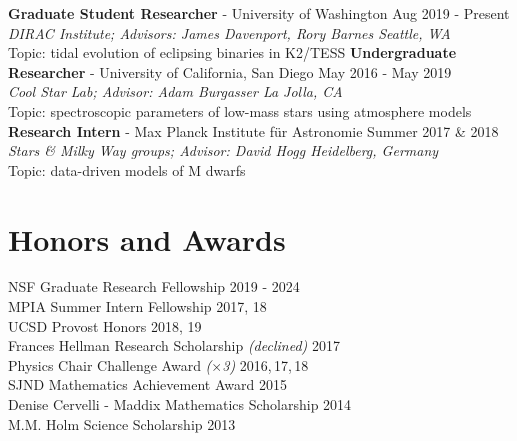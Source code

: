 \documentclass[margin,line]{resume}
\begin{document}
\begin{resume}
\textbf{Graduate Student Researcher} - University of Washington \hfill Aug 2019 - Present \\
\-\hspace{.25cm} \textit{DIRAC Institute; Advisors: James Davenport, Rory Barnes \hfill Seattle, WA} \\
\-\hspace{.25cm} Topic: tidal evolution of eclipsing binaries in K2/TESS
\vspace{.2cm} \newline
\textbf{Undergraduate Researcher} - University of California, San Diego \hfill May 2016 - May 2019  \\
\-\hspace{.25cm} \textit{Cool Star Lab; Advisor: Adam Burgasser \hfill La Jolla, CA} \\ 
\-\hspace{.25cm} Topic: spectroscopic parameters of low-mass stars using atmosphere models 
\vspace{.2cm} \newline
\textbf{Research Intern} - Max Planck Institute f{\"u}r Astronomie \hfill Summer 2017 \& 2018 \\
\-\hspace{.25cm} \textit{Stars \& Milky Way groups; Advisor: David Hogg \hfill Heidelberg, Germany} \\
\-\hspace{.25cm} Topic: data-driven models of M dwarfs



\section{\mysidestyle \textcolor{bcolor}{Honors and Awards}}
NSF Graduate Research Fellowship \hfill 2019 - 2024 \\
MPIA Summer Intern Fellowship \hfill 2017, 18 \\
UCSD Provost Honors \hfill 2018, 19 \\
Frances Hellman Research Scholarship \textit{(declined)} \hfill 2017 \\
Physics Chair Challenge Award \textit{($\times$3)} \hfill 2016,\,17,\,18 \\
SJND Mathematics Achievement Award \hfill 2015 \\
Denise Cervelli - Maddix Mathematics Scholarship \hfill 2014 \\
M.M. Holm Science Scholarship \hfill 2013



\end{resume}
\end{document}
